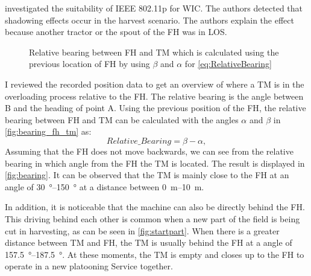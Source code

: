 \documentclass[]{nsm-thesis}
\begin{document}
\textcite{klingler_agriculture_2018} investigated the suitability of IEEE 802.11p for \ac{WIC}. The authors detected that shadowing effects occur in the harvest scenario. The authors explain the effect because another tractor or the spout of the \ac{FH} was in \ac{LOS}.
\begin{figure}%
	\centering
	\caption{Relative bearing between \ac{FH} and \ac{TM} which is calculated using the previous location of \ac{FH} by using $\beta$ and $\alpha$ for \autoref{eq:RelativeBearing}}%
	\label{fig:bearing_fh_tm}%
\end{figure}
I reviewed the recorded position data to get an overview of where a \ac{TM} is in the overloading process relative to the \ac{FH}. The relative bearing is the angle between B and the heading of point A. Using the previous position of the \ac{FH}, the relative bearing between \ac{FH} and \ac{TM} can be calculated with the angles $\alpha$ and $\beta$ in \autoref{fig:bearing_fh_tm} as:
\begin{equation}\label{eq:RelativeBearing}
	Relative\_Bearing = \beta - \alpha	,
\end{equation}
Assuming that the \ac{FH} does not move backwards, we can see from the relative bearing in which angle from the \ac{FH} the \ac{TM} is located. The result is displayed in \autoref{fig:bearing}. It can be observed that the \ac{TM} is mainly close to the \ac{FH} at an angle of \SIrange{30}{150}{\degree} at a distance between \SIrange{0}{10}{\metre}. 

In addition, it is noticeable that the machine can also be directly behind the \ac{FH}. This driving behind each other is common when a new part of the field is being cut in harvesting, as can be seen in \autoref{fig:startpart}. When there is a greater distance between \ac{TM} and \ac{FH}, the \ac{TM} is usually behind the FH at a angle of \SIrange{157.5}{187.5}{\degree}. At these moments, the \ac{TM} is empty and closes up to the \ac{FH} to operate in a new platooning Service together. 
\end{document}
